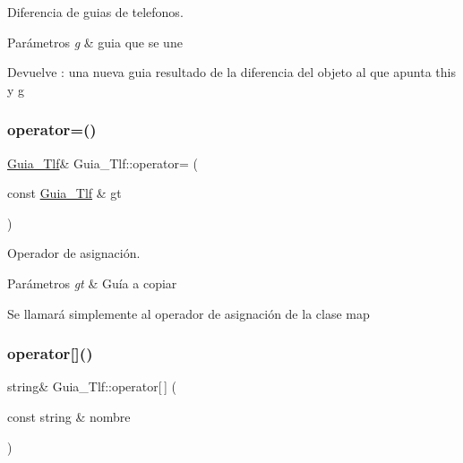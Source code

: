 Diferencia de guias de telefonos. 


\begin{DoxyParams}{Parámetros}
{\em g} & guia que se une \\
\hline
\end{DoxyParams}
\begin{DoxyReturn}{Devuelve}
\+: una nueva guia resultado de la diferencia del objeto al que apunta this y g 
\end{DoxyReturn}
\mbox{\label{classGuia__Tlf_a12f2f749da1ccb349e63cd55437848dd}} 
\subsubsection{\texorpdfstring{operator=()}{operator=()}}
{\footnotesize\ttfamily \hyperlink{classGuia__Tlf}{Guia\+\_\+\+Tlf}\& Guia\+\_\+\+Tlf\+::operator= (\begin{DoxyParamCaption}\item[{const \hyperlink{classGuia__Tlf}{Guia\+\_\+\+Tlf} \&}]{gt }\end{DoxyParamCaption})\hspace{0.3cm}{\ttfamily [inline]}}



Operador de asignación. 


\begin{DoxyParams}{Parámetros}
{\em gt} & Guía a copiar\\
\hline
\end{DoxyParams}
Se llamará simplemente al operador de asignación de la clase map \mbox{\label{classGuia__Tlf_a6eed62abe5d13de96934e6897aaf9184}} 
\subsubsection{\texorpdfstring{operator[]()}{operator[]()}}
{\footnotesize\ttfamily string\& Guia\+\_\+\+Tlf\+::operator\mbox{[}$\,$\mbox{]} (\begin{DoxyParamCaption}\item[{const string \&}]{nombre }\end{DoxyParamCaption})\hspace{0.3cm}{\ttfamily [inline]}}



